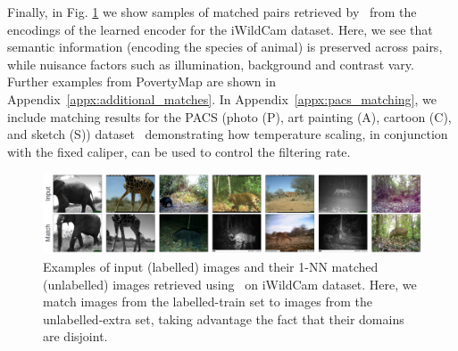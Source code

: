 Finally, in Fig. \ref{fig:matches_examples} we show samples of matched pairs retrieved by \CNN\
from the encodings of the learned encoder for the iWildCam dataset.
%
Here, we see that semantic information (encoding the species of animal) is preserved across pairs,
while nuisance factors such as illumination, background and contrast vary.
%
Further examples from PovertyMap are shown in Appendix~\ref{appx:additional_matches}. In
Appendix~\ref{appx:pacs_matching}, we include matching results for the PACS (photo (P), art painting (A), cartoon (C), and
sketch (S))
dataset~\cite{li2017deeper} demonstrating how temperature scaling, in conjunction with the fixed
caliper, can be used to control the filtering rate.

\begin{figure}[tbp]
  \centering
  \includegraphics[width=1.\textwidth]{figures/matches_examples_2.pdf}
  \caption{Examples of input (labelled) images and their 1-NN matched (unlabelled) images retrieved using \CNN\ on iWildCam dataset. Here, we match images from the labelled-train set to images from the unlabelled-extra set, taking advantage the fact that their domains are disjoint.
  }
  \label{fig:matches_examples}
\end{figure}
